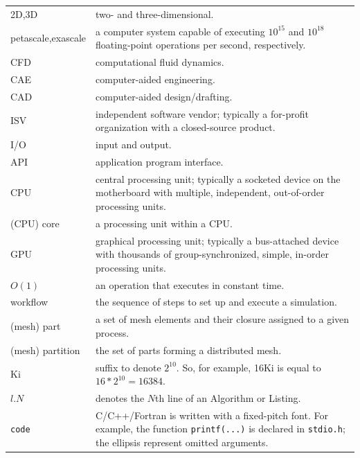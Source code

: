 \begin{tabular}{l|p{10cm}}
2D,3D              & two- and three-dimensional.\\
petascale,exascale & a computer system capable of executing $10^{15}$
                     and $10^{18}$ floating-point operations
                     per second, respectively.\\
CFD                & computational fluid dynamics.\\
CAE                & computer-aided engineering.\\
CAD                & computer-aided design/drafting.\\
ISV                & independent software vendor; typically a for-profit
                     organization with a closed-source product.\\
I/O                & input and output.\\
API                & application program interface.\\
CPU                & central processing unit; typically a socketed device
                     on the motherboard with multiple, independent, out-of-order
                     processing units.\\
(CPU) core         & a processing unit within a CPU.\\
GPU                & graphical processing unit; typically a bus-attached
                     device with thousands of group-synchronized, simple,
                     in-order processing units.\\
$O(1)$             & an operation that executes in constant time.\\
workflow           & the sequence of steps to set up and execute a
                     simulation.\\
(mesh) part        & a set of mesh elements and their closure assigned
                     to a given process.\\
(mesh) partition   & the set of parts forming a distributed mesh.\\
Ki                 & suffix to denote $2^{10}$. So, for example,
                     16Ki is equal to $16*2^{10} = 16384$.\\
$l.N$              & denotes the $N$th line of an Algorithm or
                     Listing.\\
\texttt{code}      & C/C++/Fortran is written with a fixed-pitch font.
                     For example, the function \texttt{printf(...)} is
                     declared in \texttt{stdio.h}; the ellipsis
                     represent omitted arguments.\\
\end{tabular}


